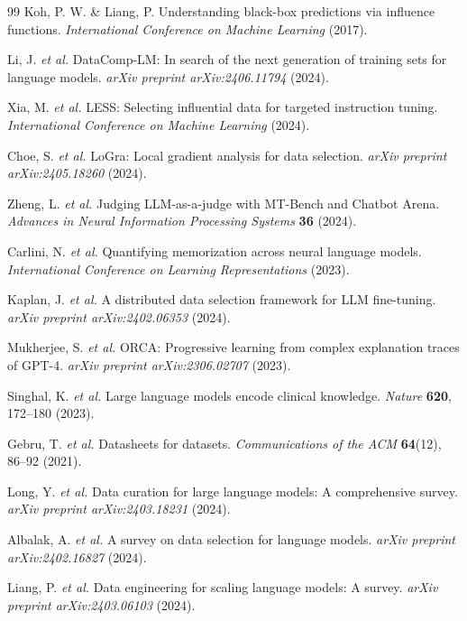 \documentclass[11pt,twocolumn]{article}
\begin{document}
\begin{thebibliography}{99}
Koh, P. W. \& Liang, P. Understanding black-box predictions via influence functions. \textit{International Conference on Machine Learning} (2017).

Li, J. \textit{et al.} DataComp-LM: In search of the next generation of training sets for language models. \textit{arXiv preprint arXiv:2406.11794} (2024).

Xia, M. \textit{et al.} LESS: Selecting influential data for targeted instruction tuning. \textit{International Conference on Machine Learning} (2024).

Choe, S. \textit{et al.} LoGra: Local gradient analysis for data selection. \textit{arXiv preprint arXiv:2405.18260} (2024).

Zheng, L. \textit{et al.} Judging LLM-as-a-judge with MT-Bench and Chatbot Arena. \textit{Advances in Neural Information Processing Systems} \textbf{36} (2024).

Carlini, N. \textit{et al.} Quantifying memorization across neural language models. \textit{International Conference on Learning Representations} (2023).

Kaplan, J. \textit{et al.} A distributed data selection framework for LLM fine-tuning. \textit{arXiv preprint arXiv:2402.06353} (2024).

Mukherjee, S. \textit{et al.} ORCA: Progressive learning from complex explanation traces of GPT-4. \textit{arXiv preprint arXiv:2306.02707} (2023).

Singhal, K. \textit{et al.} Large language models encode clinical knowledge. \textit{Nature} \textbf{620}, 172--180 (2023).

Gebru, T. \textit{et al.} Datasheets for datasets. \textit{Communications of the ACM} \textbf{64}(12), 86--92 (2021).

Long, Y. \textit{et al.} Data curation for large language models: A comprehensive survey. \textit{arXiv preprint arXiv:2403.18231} (2024).

Albalak, A. \textit{et al.} A survey on data selection for language models. \textit{arXiv preprint arXiv:2402.16827} (2024).

Liang, P. \textit{et al.} Data engineering for scaling language models: A survey. \textit{arXiv preprint arXiv:2403.06103} (2024).


\end{thebibliography}
\end{document}
